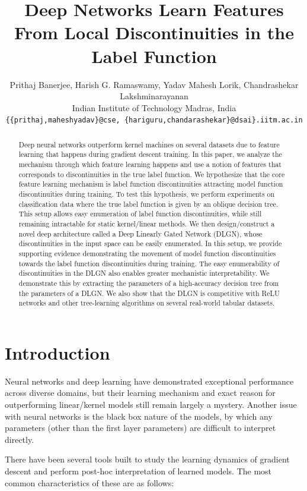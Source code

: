 \documentclass{article} %
\title{Deep Networks Learn Features From Local Discontinuities in the Label Function}
\author{Prithaj Banerjee, Harish G. Ramaswamy, Yadav Mahesh Lorik, Chandrashekar Lakshminarayanan \\
Indian Institute of Technology Madras, India \\[2pt]
\texttt{\{\{prithaj,maheshyadav\}@cse, \{hariguru,chandarashekar\}@dsai\}.iitm.ac.in}
}
\renewcommand{\>}{{\rightarrow}}
\renewcommand{\=}{\stackrel{\triangle}{=}}
\newcommand{\0}{{\mathbf 0}}
\begin{document}
\maketitle

\begin{abstract}
Deep neural networks outperform kernel machines on several datasets due to feature learning that happens during gradient descent training. In this paper, we analyze the mechanism through which feature learning happens and use a notion of features that corresponds to discontinuities in the true label function. We hypothesize that the core feature learning mechanism is label function discontinuities attracting model function discontinuities during training. To test this hypothesis, we perform experiments on classification data where the true label function is given by an oblique decision tree. This setup allows easy enumeration of label function discontinuities, while still remaining intractable for static kernel/linear methods. We then design/construct a novel deep architecture called a Deep Linearly Gated Network (DLGN), whose discontinuities in the input space can be easily enumerated.  In this setup, we provide supporting evidence demonstrating the movement of model function discontinuities towards the label function discontinuities during training. The easy enumerability of discontinuities in the DLGN also enables greater mechanistic interpretability. We demonstrate this by extracting the parameters of a high-accuracy decision tree from the parameters of a DLGN. We also show that the DLGN is competitive with ReLU networks and other tree-learning algorithms on several real-world tabular datasets.
\end{abstract}

\section{Introduction}\label{sec:intro}

Neural networks and deep learning have demonstrated exceptional performance across diverse domains, but their learning mechanism and exact reason for outperforming linear/kernel models still remain largely a mystery. Another issue with neural networks is the black box nature of the models, by which any parameters (other than the first layer parameters) are difficult to interpret directly. 

There have been several tools built to study the learning dynamics of gradient descent and perform post-hoc interpretation of learned models. The most common characteristics of these are as follows:
\end{document}
